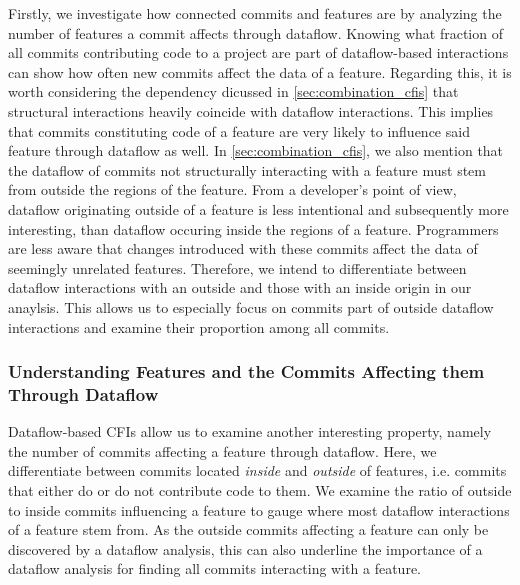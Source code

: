 Firstly, we investigate how connected commits and features are by analyzing the number of features a commit affects through dataflow.
Knowing what fraction of all commits contributing code to a project are part of dataflow-based interactions can show how often new commits affect the data of a feature. 
Regarding this, it is worth considering the dependency dicussed in \autoref{sec:combination_cfis} that structural interactions heavily coincide with dataflow interactions.
This implies that commits constituting code of a feature are very likely to influence said feature through dataflow as well.
In \autoref{sec:combination_cfis}, we also mention that the dataflow of commits not structurally interacting with a feature must stem from outside the regions of the feature. 
From a developer's point of view, dataflow originating outside of a feature is less intentional and subsequently more interesting, than dataflow occuring inside the regions of a feature. 
Programmers are less aware that changes introduced with these commits affect the data of seemingly unrelated features.
Therefore, we intend to differentiate between dataflow interactions with an outside and those with an inside origin in our anaylsis.
This allows us to especially focus on commits part of outside dataflow interactions and examine their proportion among all commits. 

\subsubsection*{Understanding Features and the Commits Affecting them Through Dataflow}

Dataflow-based CFIs allow us to examine another interesting property, namely the number of commits affecting a feature through dataflow.
Here, we differentiate between commits located \emph{inside} and \emph{outside} of features, i.e. commits that either do or do not contribute code to them.
We examine the ratio of outside to inside commits influencing a feature to gauge where most dataflow interactions of a feature stem from.
As the outside commits affecting a feature can only be discovered by a dataflow analysis, this can also underline the importance of a dataflow analysis for finding all commits interacting with a feature. 

